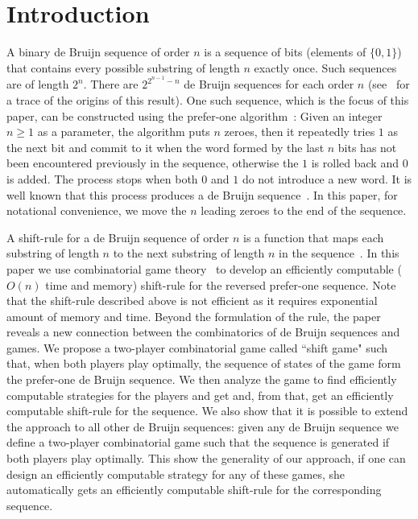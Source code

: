 \documentclass[final,12pt]{elsarticle}
\theoremstyle{definition} \newtheorem{definition}[theorem]{Definition} \newtheorem{observation}[theorem]{Observation} \newtheorem{example}[theorem]{Example} \newtheorem{remark}[theorem]{Remark} \newtheorem{corrolary}[theorem]{Corrolary}
\begin{document}
\section{Introduction}
\label{sec:introduction}

A binary de Bruijn sequence of order $n$ is a sequence of bits (elements of $\{0,1\}$) that contains every possible substring of length $n$ exactly once. Such sequences are of length $2^n$. There are $2^{2^{n-1}-n}$ de Bruijn sequences for each order $n$ (see~\cite{de1975acknowledgement} for a trace of the origins of this result). One such sequence, which is the focus of this paper, can be constructed using the prefer-one algorithm~\cite{Mar34}: Given an integer $n \geq 1$ as a parameter, the algorithm puts $n$ zeroes, then it repeatedly tries $1$ as the next bit and commit to it when the word formed by the last $n$ bits has not been encountered previously in the sequence, otherwise the $1$ is rolled back and $0$ is added. The process stops when both $0$ and $1$ do not introduce a new word. It is well known that this process produces a de Bruijn sequence~\cite{Mar34}. In this paper, for notational convenience, we move the $n$ leading zeroes to the end of the sequence.

A shift-rule for a de Bruijn sequence of order $n$ is a function that maps each substring of length $n$ to the next substring of length $n$ in the sequence~\cite{SAWADA2017524}. In this paper we use combinatorial game theory~\cite{berlekamp2003winning} to develop an efficiently computable ($O(n)$ time and memory) shift-rule for the reversed prefer-one sequence. Note that the shift-rule described above is not efficient as it requires exponential amount of memory and time. Beyond the formulation of the rule, the paper reveals a new connection between the combinatorics of de Bruijn sequences and games. We propose a two-player combinatorial game called ``shift game" such that, when both players play optimally, the sequence of states of the game form the prefer-one de Bruijn sequence. We then analyze the game to find efficiently computable strategies for the players and get and, from that, get an efficiently computable shift-rule for the sequence. We also show that it is possible to extend the approach to all other de Bruijn sequences: given any de Bruijn sequence we define a two-player combinatorial game such that the sequence is generated if both players play optimally. This show the generality of our approach, if one can design an efficiently computable strategy for any of these games, she automatically gets an efficiently computable shift-rule for the corresponding sequence.
\end{document}
